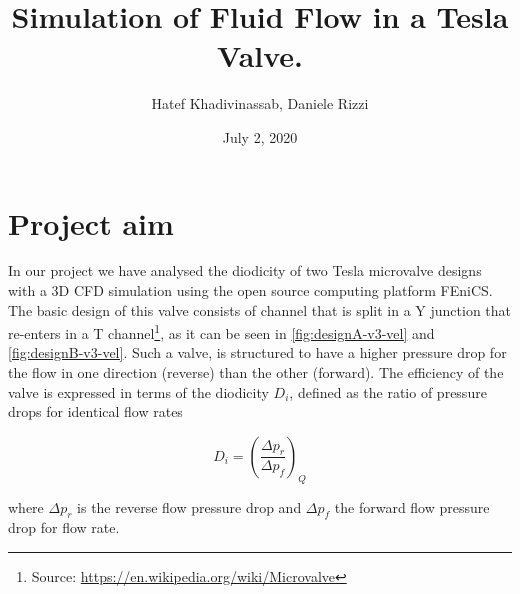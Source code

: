 \documentclass[11pt, letterpaper]{amsart}
\title{Simulation of Fluid Flow in a Tesla Valve.}
\author{Hatef Khadivinassab, Daniele Rizzi}
\date{July 2, 2020}
\begin{document}
\maketitle

\section{Project aim}
In our project we have analysed the diodicity of two Tesla microvalve designs with a 3D CFD simulation using the open source computing platform FEniCS.
The basic design of this valve consists of channel that is split in a Y junction that re-enters in a T channel\footnote{Source: \url{https://en.wikipedia.org/wiki/Microvalve}}, as it can be seen in \ref{fig:designA-v3-vel} and \ref{fig:designB-v3-vel}.
Such a valve, is structured to have a higher pressure drop for the flow in one direction (reverse) than the other (forward). The efficiency of the valve is expressed in terms of the diodicity $D_i$, defined as the ratio of pressure drops for identical flow rates

\begin{equation}
	D_i = \left({\frac {\Delta p_{r}}{\Delta p_{f}}}\right)_{Q}
	\label{eq:diodicity}
\end{equation}

\noindent where $\Delta p_{r}$ is the reverse flow pressure drop and $\Delta p_{f}$ the forward flow pressure drop for flow rate.

\end{document}
